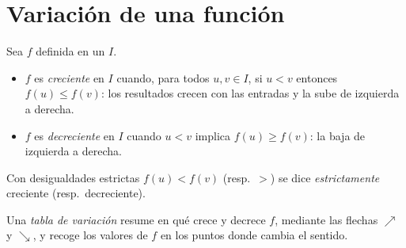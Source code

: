 \section{Variación de una función}

\begin{definition}\label{def:g10:functions:variations}
Sea $f$ definida en un  $I$.
\begin{itemize}
  \item $f$ es \emph{creciente} en $I$ cuando,
        para todos $u, v \in I$, si $u < v$ entonces $f(u) \leq f(v)$: los
        resultados crecen con las entradas y la  sube de izquierda
        a derecha.
  \item $f$ es \emph{decreciente} en $I$ cuando
        $u < v$ implica $f(u) \geq f(v)$: la  baja de izquierda a
        derecha.
\end{itemize}
Con desigualdades estrictas $f(u) < f(v)$ (resp.\ $>$) se dice
\emph{estrictamente} creciente (resp.\ decreciente).
\end{definition}

\begin{definition}\label{def:g10:functions:table}
Una \emph{tabla de variación} resume en qué
 crece y decrece $f$, mediante las flechas $\nearrow$ y
$\searrow$, y recoge los valores de $f$ en los puntos donde cambia el
sentido.
\end{definition}

